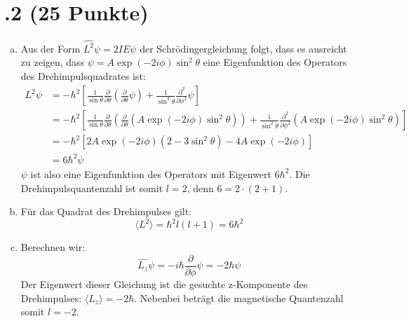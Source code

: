 \section*{\nr.2 \tittwo (25 Punkte)}
\begin{enumerate}[(a)]
\item Aus der Form $\hat{L^2}\psi = 2IE \psi$ der Schrödingergleichung folgt, dass es ausreicht zu zeigen, dass $\psi=A\exp(-2i\phi)\sin^2{\theta}$ eine Eigenfunktion des Operators des Drehimpulsquadrates ist:
\begin{align}
\hat{L^2}\psi &= -\hbar^2 \left[ \frac{1}{\sin{\theta}}\frac{\partial}{\partial\theta}\left(\frac{\partial}{\partial\theta}\psi \right) + \frac{1}{\sin^2{\theta}}\frac{\partial^2}{\partial \phi^2}\psi\right] \\
&= -\hbar^2 \left[ \frac{1}{\sin{\theta}}\frac{\partial}{\partial\theta}\left(\frac{\partial}{\partial\theta}\left(A\exp(-2i\phi)\sin^2{\theta}\right) \right) + \frac{1}{\sin^2{\theta}}\frac{\partial^2}{\partial \phi^2}\left(A\exp(-2i\phi)\sin^2{\theta}\right) \right] \\
&= -\hbar^2 \left[ 2A\exp(-2i\phi)\left(2-3\sin^2{\theta}\right)-4A\exp(-2i\phi)\right] \\
&= 6 \hbar^2 \psi 
\end{align}
$\psi$ ist also eine Eigenfunktion des Operators mit Eigenwert $6\hbar^2$. Die Drehimpulsquantenzahl ist somit $l=2$, denn $6=2\cdot(2+1)$. 
\item Für das Quadrat des Drehimpulses gilt:
\begin{equation}
\langle L^{2} \rangle = \hbar^2 l(l+1) = 6\hbar^2 
\end{equation}
\item Berechnen wir:
\begin{equation}
\hat{L_z}\psi = -i\hbar \frac{\partial}{\partial \phi} \psi = -2\hbar \psi
\end{equation}
Der Eigenwert dieser Gleichung ist die gesuchte z-Komponente des Drehimpulses: $\langle L_z\rangle = -2\hbar$. Nebenbei beträgt die magnetische Quantenzahl somit $l=-2$.
\end{enumerate}